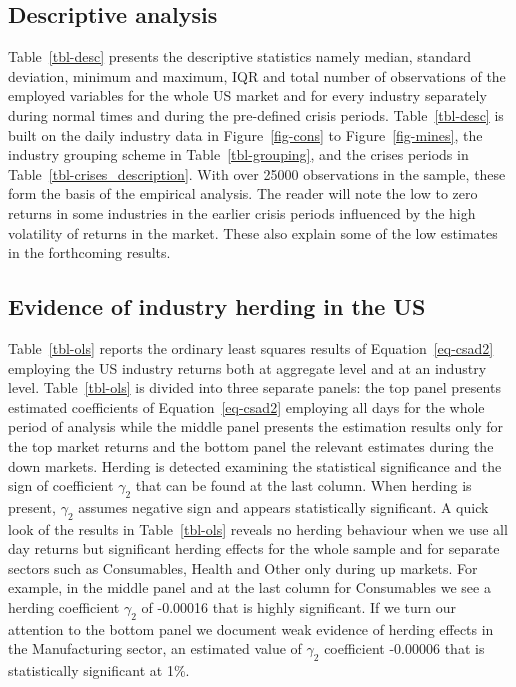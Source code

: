 \documentclass[
  letterpaper,
  DIV=11,
  numbers=noendperiod]{scrartcl}
\begin{document}
\subsection{Descriptive analysis}\label{descriptive-analysis}

Table~\ref{tbl-desc} presents the descriptive statistics namely median,
standard deviation, minimum and maximum, IQR and total number of
observations of the employed variables for the whole US market and for
every industry separately during normal times and during the pre-defined
crisis periods. Table~\ref{tbl-desc} is built on the daily industry data
in Figure~\ref{fig-cons} to Figure~\ref{fig-mines}, the industry
grouping scheme in Table~\ref{tbl-grouping}, and the crises periods in
Table~\ref{tbl-crises_description}. With over 25000 observations in the
sample, these form the basis of the empirical analysis. The reader will
note the low to zero returns in some industries in the earlier crisis
periods influenced by the high volatility of returns in the market.
These also explain some of the low estimates in the forthcoming results.

\subsection{Evidence of industry herding in the
US}\label{evidence-of-industry-herding-in-the-us}

Table~\ref{tbl-ols} reports the ordinary least squares results of
Equation~\ref{eq-csad2} employing the US industry returns both at
aggregate level and at an industry level. Table~\ref{tbl-ols} is divided
into three separate panels: the top panel presents estimated
coefficients of Equation~\ref{eq-csad2} employing all days for the whole
period of analysis while the middle panel presents the estimation
results only for the top market returns and the bottom panel the
relevant estimates during the down markets. Herding is detected
examining the statistical significance and the sign of coefficient
\(\gamma_2\) that can be found at the last column. When herding is
present, \(\gamma_2\) assumes negative sign and appears statistically
significant. A quick look of the results in Table~\ref{tbl-ols} reveals
no herding behaviour when we use all day returns but significant herding
effects for the whole sample and for separate sectors such as
Consumables, Health and Other only during up markets. For example, in
the middle panel and at the last column for Consumables we see a herding
coefficient \(\gamma_2\) of -0.00016 that is highly significant. If we
turn our attention to the bottom panel we document weak evidence of
herding effects in the Manufacturing sector, an estimated value of
\(\gamma_2\) coefficient -0.00006 that is statistically significant at
1\%.
\end{document}
